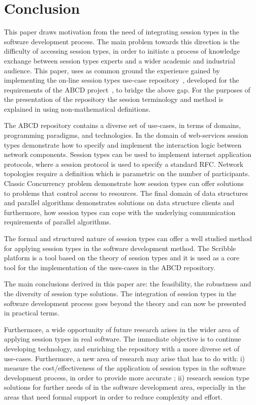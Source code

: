 \section{Conclusion}
\label{sec:conclusion}

This paper draws motivation from the need
of integrating session types in the software
development process. The main problem towards
this direction is the difficulty of accessing
session types, in order to initiate a process
of knowledge exchange between session types
experts and a wider academic and industrial
audience. This paper, uses as common ground
the experience gained by implementing
the on-line session types use-case
repository~\cite{usecases_repository}, developed for the
requirements of the ABCD project~\cite{ABCD},
to bridge the above gap. For the purposes of
the presentation of the repository the session terminology
and method is explained in using non-mathematical
definitions.

The ABCD repository contains a 
diverse set of use-cases, in terms of domains,
programming paradigms, and technologies.
In the domain of web-services session types
demonstrate how to specify and implement
the interaction logic between network components.
Session types can be used to implement internet
application protocols, where a session protocol
is used to specify a standard RFC. Network topologies
require a definition which is parametric on the number
of participants. Classic Concurrency problem demonstrate
how session types can offer solutions to problems
that control access to resources. The final domain
of data structures and parallel algorithms demonstrates
solutions on data structure clients and furthermore,
how session types can cope with the underlying communication
requirements of parallel algorithms.

The formal and structured nature of session types
can offer a well studied method for applying 
session types in the software development method.
The Scribble platform is a tool based on the
theory of session types and it is used as
a core tool 
for the implementation of the uses-cases in the
ABCD repository.

The main conclusions derived in this paper are: the feasibility,
the robustness and the diversity of session type solutions.
The integration of session types in the software development
process goes beyond the theory and can now be presented
in practical terms.

Furthermore, a wide opportunity of future research arises
in the wider area of applying session types in real software.
The immediate objective is to continue developing technology,
and enriching the repository with a more diverse set of
use-cases.
Furthermore, a new area of research may arise that has to
do with: i) measure the cost/effectiveness of the
application of session types in
the software development process, in order to provide
more accurate ; ii) research session type solutions for
further needs of in the software development area, especially
in the areas that need formal support in order to reduce
complexity and effort.
